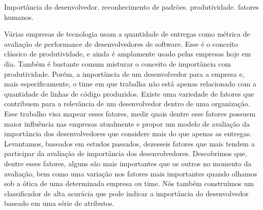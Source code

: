 \documentclass[dissertmst]{ppgco}
\begin{document}


\begin{resumo}{Importância do desenvolvedor. reconhecimento de padrões. produtividade. fatores humanos.}

 	 Várias empresas de tecnologia usam a quantidade de entregas como métrica de avaliação de performance de desenvolvedores de software. Esse é o conceito clássico de produtividade, e ainda é amplamente usado pelas empresas hoje em dia. Também é bastante comum misturar o conceito de importância com produtividade. Porém, a importância de um desenvolvedor para a empresa e, mais especificamente, o time em que trabalha não está apenas relacionado com a quantidade de linhas de código produzidos. Existe uma variedade de fatores que contribuem para a relevância de um desenvolvedor dentro de uma organização. Esse trabalho visa mapear esses fatores, medir quais dentre esse fatores possuem maior influência nas empresas atualmente e propor um modelo de avaliação da importância dos desenvolvedores que considere mais do que apenas as entregas. Levantamos, baseados em estudos passados, dezesseis fatores que mais tendem a participar da avaliação de importância dos desenvolvedores. Descobrimos que, dentre esses fatores, alguns são mais importantes que os outros no momento da avaliação, bem como uma variação nos fatores mais importantes quando olhamos sob a ótica de uma determinada empresa ou time. Nós também construímos um classificador de alta acurácia que pode indicar a importância do desenvolvedor baseado em uma série de atributos.
     
\end{resumo}
\end{document}
